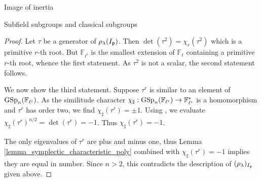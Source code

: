 \documentclass[11pt,a4paper]{article}
\newcommand{\Fl}{\mathbb{F}_\ell}
\newcommand{\Fli}{\mathbb{F}_{\ell^i}}
\begin{document}
\begin{section}{Image of inertia}
\begin{subsection}{Subfield subgroups and classical subgroups}
\begin{proof}
Let $\tau$ be a generator of $\rho_\lambda(I_{\mathfrak{p}})$. Then $\det ( \tau^2) = \chi_r(\tau^2)$ which is a primitive $r$-th root. But $\Fli$ is the smallest extension of $\Fl$ containing a primitive $r$-th root, whence the first statement.
As $\tau^2$ is not a scalar, the second statement follows.

We now show the third statement. Suppose $\tau^r$ is similar to an element of $\GSp_n(\Fli)$.
As the similitude character $\chi_\sharp : \GSp_n(\Fli) \rightarrow \Fli^*$ is a homomorphism and $\tau^r$ has order two, we find $\chi_\sharp (\tau^r)=\pm 1$.
Using \cite[Lemma 2.4.5]{KleidmanLiebeck}, we evaluate $\chi_\sharp (\tau^r)^{n/2}= \det( \tau^r)=-1$. Thus $\chi_\sharp (\tau^r)=-1$.


The only eigenvalues of $\tau^r$ are plus and minus one, thus Lemma \ref{lemma_symplectic_characteristic_poly} combined with $\chi_\sharp (\tau^r)=-1$ implies they are equal in number. Since $n>2$, this contradicts the description of $(\rho_\lambda)_{I_{\mathfrak{p}}}$ given above.
\end{proof}

\end{subsection}
\end{section}
\end{document}
